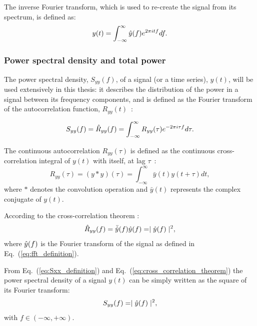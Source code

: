 The inverse Fourier transform, which is used to re-create the signal from its spectrum, is defined as:
\begin{equation}\label{eq:ifft_definition}
y(t) = \int_{-\infty}^{\infty} \hat{y}(f) e^{2\pi {i} t f} df.
\end{equation}

\subsubsection*{Power spectral density and total power} %
The power spectral density, $S_{yy}(f)$, of a signal (or a time series), $y(t)$, will be used extensively in this thesis: it describes the distribution of the power in a signal between its frequency components, and is defined as the Fourier transform of the autocorrelation function, $R_{yy}(t)$~\cite{b_papoulis1991probability}: %

\begin{equation}\label{eq:Sxx_definition}
    S_{yy}(f) = \hat{R}_{yy}(f) =  \int_{-\infty}^{\infty} R_{yy}(\tau)e^{-2\pi {i} \tau f} d\tau.
\end{equation}

The continuous autocorrelation $R_{yy}(\tau)$ is defined as the continuous cross-correlation integral of $y(t)$ with itself, at lag $\tau$~\cite{FFT_and_applications}:
\begin{equation}\label{eq:Rxx_definition}
    R_{yy}(\tau) = (y \ast y)(\tau) = \int_{-\infty}^{\infty} \bar{y}(t) y(t+\tau) dt,
\end{equation}
where $\ast$ denotes the convolution operation and $\bar{y}(t)$ represents the complex conjugate of $y(t)$.

According to the cross-correlation theorem \cite{FFT_and_applications}:
\begin{equation}\label{eq:cross_correlation_theorem}
\hat{R}_{yy}(f) = \bar{\hat{y}}(f) \hat{y}(f) = \mid \hat{y}(f) \mid ^2,
\end{equation}
where $\hat{y}(f)$ is the Fourier transform of the signal as defined in Eq.~(\ref{eq:fft_definition}).

From Eq.~(\ref{eq:Sxx_definition}) and Eq.~(\ref{eq:cross_correlation_theorem}) the power spectral density of a signal $y(t)$ can be simply written as the square of its Fourier transform:
\begin{equation}\label{eq:Sxx_definition_v2}
S_{yy}(f) = \mid \hat{y}(f) \mid ^2,
\end{equation}
with  $f \in \left(-\infty, +\infty \right )$.

